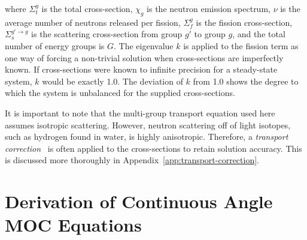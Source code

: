 where $\Sigma_t^{g}$ is the total cross-section, $\chi_{g}$ is the neutron emission spectrum, $\nu$ is the average number of neutrons released per fission, $\Sigma_f^{g}$ is the fission cross-section, $\Sigma_{s}^{g' \rightarrow g}$ is the scattering cross-section from group $g'$ to group $g$, and the total number of energy groups is $G$. The eigenvalue $k$ is applied to the fission term as one way of forcing a non-trivial solution when cross-sections are imperfectly known. If cross-sections were known to infinite precision for a steady-state system, $k$ would be exactly 1.0. The deviation of $k$ from 1.0 shows the degree to which the system is unbalanced for the supplied cross-sections.

It is important to note that the multi-group transport equation used here assumes isotropic scattering. However, neutron scattering off of light isotopes, such as hydrogen found in water, is highly anisotropic. Therefore, a \textit{transport correction}~\cite{bell1967transport} is often applied to the cross-sections to retain solution accuracy. This is discussed more thoroughly in Appendix~\ref{app:transport-correction}.


\section{Derivation of Continuous Angle MOC Equations}
\label{sec:derivation-of-moc}


